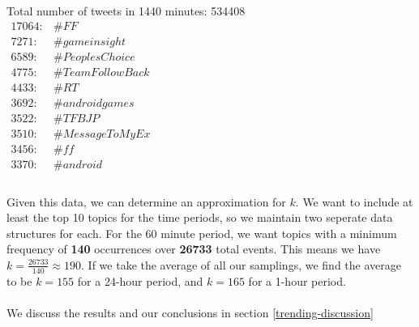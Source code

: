 Total number of tweets in 1440 minutes: 534408\\

$\begin{array}{ll}
    17064: & \#FF \\
    7271: & \#gameinsight \\
    6589: & \#PeoplesChoice \\
    4775: & \#TeamFollowBack \\
    4433: & \#RT \\
    3692: & \#androidgames \\
    3522: & \#TFBJP \\
    3510: & \#MessageToMyEx \\
    3456: & \#ff \\
    3370: & \#android \\
\end{array}$
\\
\\
Given this data, we can determine an approximation for $k$. We want to include at least the top 10 topics for the time periods, so we maintain two seperate data structures for each. For the 60 minute period, we want topics with a minimum frequency of \textbf{140} occurrences over \textbf{26733} total events. This means we have $k = \frac{26733}{140} \approx 190$. If we take the average of all our samplings, we find the average to be $k = 155$ for a 24-hour period, and $k = 165$ for a 1-hour period.
\\
\\
We discuss the results and our conclusions in section \ref{trending-discussion}
